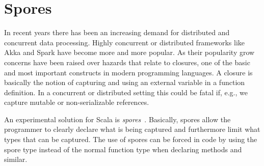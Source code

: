 
\section{Spores}\label{sec:spores}

In recent years there has been an increasing demand for distributed and
concurrent data processing. Highly concurrent or distributed frameworks like
Akka and Spark have become more and more popular. As their popularity grow
concerns have been raised over hazards that relate to closures, one of the basic
and most important constructs in modern programming languages. A closure is
basically the notion of capturing and using an external variable in a function
definition. In a concurrent or distributed setting this could be fatal if, e.g.,
we capture mutable or non-serializable references. 

An experimental solution for Scala is
\emph{spores}~\parencite{conf/ecoop/MillerHO14}. Basically, spores allow the
programmer to clearly declare what is being captured and furthermore limit what
types that can be captured. The use of spores can be forced in code by using the
spore type instead of the normal function type when declaring methods and
similar.




